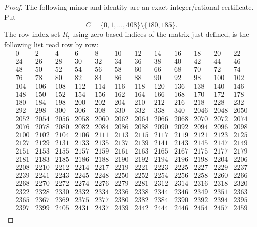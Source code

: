 \begin{proof}
The following minor and identity are an exact integer/rational
certificate. Put
\[
 C=\{0,1,\ldots,408\}\setminus\{180,185\}.
\]
The row-index set $R$, using zero-based indices of the matrix
just defined, is the following list read row by row:
{\scriptsize
\[
\begin{array}{rrrrrrrrrrrr}
0 & 2 & 4 & 6 & 8 & 10 & 12 & 14 & 16 & 18 & 20 & 22 \\
24 & 26 & 28 & 30 & 32 & 34 & 36 & 38 & 40 & 42 & 44 & 46 \\
48 & 50 & 52 & 54 & 56 & 58 & 60 & 66 & 68 & 70 & 72 & 74 \\
76 & 78 & 80 & 82 & 84 & 86 & 88 & 90 & 92 & 98 & 100 & 102 \\
104 & 106 & 108 & 112 & 114 & 116 & 118 & 120 & 136 & 138 & 140 & 146 \\
148 & 150 & 152 & 154 & 156 & 162 & 164 & 166 & 168 & 170 & 172 & 178 \\
180 & 184 & 198 & 200 & 202 & 204 & 210 & 212 & 216 & 218 & 228 & 232 \\
292 & 298 & 300 & 306 & 308 & 330 & 332 & 338 & 340 & 2046 & 2048 & 2050 \\
2052 & 2054 & 2056 & 2058 & 2060 & 2062 & 2064 & 2066 & 2068 & 2070 & 2072 & 2074 \\
2076 & 2078 & 2080 & 2082 & 2084 & 2086 & 2088 & 2090 & 2092 & 2094 & 2096 & 2098 \\
2100 & 2102 & 2104 & 2106 & 2111 & 2113 & 2115 & 2117 & 2119 & 2121 & 2123 & 2125 \\
2127 & 2129 & 2131 & 2133 & 2135 & 2137 & 2139 & 2141 & 2143 & 2145 & 2147 & 2149 \\
2151 & 2153 & 2155 & 2157 & 2159 & 2161 & 2163 & 2165 & 2167 & 2175 & 2177 & 2179 \\
2181 & 2183 & 2185 & 2186 & 2188 & 2190 & 2192 & 2194 & 2196 & 2198 & 2204 & 2206 \\
2208 & 2210 & 2212 & 2214 & 2217 & 2219 & 2221 & 2223 & 2225 & 2227 & 2229 & 2237 \\
2239 & 2241 & 2243 & 2245 & 2248 & 2250 & 2252 & 2254 & 2256 & 2258 & 2260 & 2266 \\
2268 & 2270 & 2272 & 2274 & 2276 & 2279 & 2281 & 2312 & 2314 & 2316 & 2318 & 2320 \\
2322 & 2328 & 2330 & 2332 & 2334 & 2336 & 2338 & 2344 & 2346 & 2349 & 2351 & 2363 \\
2365 & 2367 & 2369 & 2375 & 2377 & 2380 & 2382 & 2384 & 2390 & 2392 & 2394 & 2395 \\
2397 & 2399 & 2405 & 2431 & 2437 & 2439 & 2442 & 2444 & 2446 & 2454 & 2457 & 2459 \\

\end{array}\]}
\end{proof}
